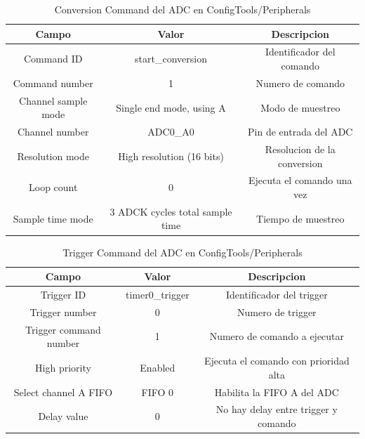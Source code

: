 \documentclass[11pt,a4paper]{article}
\begin{document}
\begin{table}[H]
    \centering
    \begin{tabular}{|c|c|c|}
        \hline
        \textbf{Campo}      & \textbf{Valor}                  & \textbf{Descripcion}        \\
        \hline
        Command ID          & start\_conversion               & Identificador del comando   \\
        Command number      & 1                               & Numero de comando           \\
        Channel sample mode & Single end mode, using A        & Modo de muestreo            \\
        Channel number      & ADC0\_A0                        & Pin de entrada del ADC      \\
        Resolution mode     & High resolution (16 bits)       & Resolucion de la conversion \\
        Loop count          & 0                               & Ejecuta el comando una vez  \\
        Sample time mode    & 3 ADCK cycles total sample time & Tiempo de muestreo          \\
        \hline
    \end{tabular}
    \caption{Conversion Command del ADC en ConfigTools/Peripherals}
\end{table}

\begin{table}[H]
    \centering
    \begin{tabular}{|c|c|c|}
        \hline
        \textbf{Campo}         & \textbf{Valor}  & \textbf{Descripcion}                  \\
        \hline
        Trigger ID             & timer0\_trigger & Identificador del trigger             \\
        Trigger number         & 0               & Numero de trigger                     \\
        Trigger command number & 1               & Numero de comando a ejecutar          \\
        High priority          & Enabled         & Ejecuta el comando con prioridad alta \\
        Select channel A FIFO  & FIFO 0          & Habilita la FIFO A del ADC            \\
        Delay value            & 0               & No hay delay entre trigger y comando  \\
        \hline
    \end{tabular}
    \caption{Trigger Command del ADC en ConfigTools/Peripherals}
\end{table}
\end{document}
